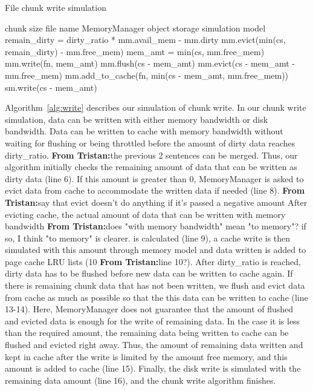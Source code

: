 \documentclass[conference]{IEEEtran}
\newcommand{\Desc}[2]{\State \makebox[2em][l]{#1}#2}
\newcommand{\tristan}[1]{\color{orange}\textbf{From Tristan:}#1\color{black}}
\begin{document}
			\begin{algorithm}\caption{File chunk write simulation}\label{alg:write}
				\small
				\begin{algorithmic}[1]
					\Input
        				\Desc{cs}{chunk size}
        				\Desc{fn}{file name}
						\Desc{mm}{MemoryManager object}
						\Desc{sm}{storage simulation model}
   					\EndInput
					\State remain\_dirty = dirty\_ratio * mm.avail\_mem - mm.dirty
					 
    					\State mm.evict(min(cs, remain\_dirty) - mm.free\_mem)
    					\State mem\_amt = min(cs, mm.free\_mem)
    					\State mm.write(fn, mem\_amt) 
    				\EndIf
					  
						\State mm.flush(cs - mem\_amt)  
						\State mm.evict(cs - mem\_amt  - mm.free\_mem) 
						\State mm.add\_to\_cache(fn, min(cs - mem\_amt, mm.free\_mem))
						\State sm.write(cs - mem\_amt)
					\EndIf
					
				\end{algorithmic}
			\end{algorithm}

			Algorithm~\ref{alg:write} describes our simulation of chunk write. 
			In our chunk write simulation, data can be written with either memory bandwidth 
			or disk bandwidth. 
			Data can be written to cache with memory bandwidth without waiting for 
			flushing or being throttled before the amount of dirty data reaches dirty\_ratio. \tristan{the previous 2 sentences can be merged.}
			Thus, our algorithm initially checks the remaining amount of data that can be written 
			as dirty data (line 6).
			If this amount is greater than 0, MemoryManager is asked to evict 
			data from cache to accommodate the written data if needed (line 8). \tristan{say that evict doesn't do anything if it's passed a negative amount}
			After evicting cache, the actual amount of data that can be written with 
			memory bandwidth \tristan{does "with memory bandwidth" mean "to memory"? if so, I think "to memory" is clearer.} is calculated (line 9), a cache write is then simulated 
			with this amount through memory model and data written is added to 
			page cache LRU lists (10 \tristan{line 10?}).
			After dirty\_ratio is reached, dirty data has to be flushed before new data 
			can be written to cache again. 
			If there is remaining chunk data that has not been written, we flush and 
			evict data from cache as much as possible so that the this data can be 
			written to cache (line 13-14). 
			Here, MemoryManager does not guarantee that the amount of flushed 
			and evicted data is enough for the write of remaining data. 
			In the case it is less than the required amount, the remaining data 
			being written to cache can be flushed and evicted right away. 
			Thus, the amount of remaining data written and kept in cache 
			after the write is limited by the amount free memory, and this amount 
			is added to cache (line 15). 
			Finally, the disk write is simulated with the remaining data amount (line 16), 
			and the chunk write algorithm finishes.
			
\end{document}
